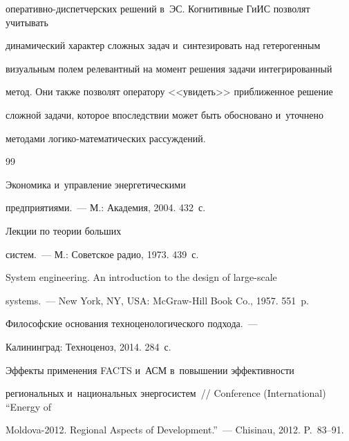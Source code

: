 опе\-ра\-тив\-но-дис\-пет\-чер\-ских решений в~ЭС. Когнитивные ГиИС позволят учитывать 


динамический характер сложных задач и~синтезировать над гетерогенным 


визуальным полем релевантный на момент решения задачи интегрированный 


метод. Они также позволят оператору <<увидеть>> приближенное решение 


сложной задачи, которое впоследствии может быть обосновано и~уточнено 


методами ло\-ги\-ко-ма\-те\-ма\-ти\-че\-ских рассуждений. 


  


 {\small\frenchspacing


{%




\begin{thebibliography}{99}




 Экономика и~управление энергетическими 


предприятиями.~--- М.: Академия, 2004. 432~с.




   Лекции по теории больших 


систем.~--- М.: Советское радио, 1973. 439~с.




   System engineering. An introduction to the design of large-scale 


systems.~--- New York, NY, USA: McGraw-Hill Book Co., 1957. 551~p.




 Философские основания техноценологического подхода.~--- 


Калининград: Техноценоз, 2014. 284~с.




   Эффекты применения FACTS и~АСМ в~повышении эффективности 


региональных и~национальных энергосистем~/\!\!/ Conference  (International) ``Energy of 


Moldova-2012. Regional Aspects of Development.''~--- Chisinau, 2012. P.~83--91.



\end{thebibliography}}}
